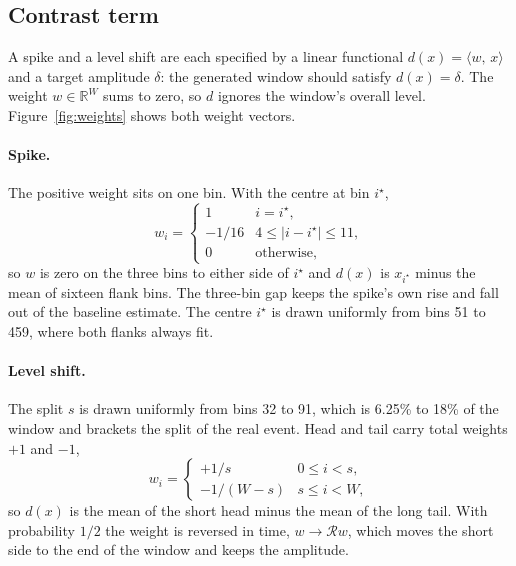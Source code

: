 \documentclass[11pt,a4paper]{article}
\newcommand{\R}{\mathbb{R}}
\newcommand{\istar}{i^{\star}}             %
\newcommand{\rev}{\mathcal{R}}             %
\newcommand{\inner}[2]{\langle #1,\, #2 \rangle}
\begin{document}
\subsection{Contrast term}
\label{sec:contrast}

A spike and a level shift are each specified by a linear functional
$d(x) = \inner{w}{x}$ and a target amplitude $\delta$: the generated window
should satisfy $d(x) = \delta$. The weight $w \in \R^{W}$ sums to zero, so $d$
ignores the window's overall level. Figure~\ref{fig:weights} shows both weight
vectors.

\paragraph{Spike.}
The positive weight sits on one bin. With the centre at bin $\istar$,
\begin{equation}
\label{eq:wspike}
w_{i}
  =
  \begin{cases}
    1 & i = \istar, \\
    -1/16 & 4 \le \lvert i - \istar \rvert \le 11, \\
    0 & \text{otherwise,}
  \end{cases}
\end{equation}
so $w$ is zero on the three bins to either side of $\istar$ and
$d(x)$ is $x_{\istar}$ minus the mean of sixteen flank bins. The three-bin gap
keeps the spike's own rise and fall out of the baseline estimate. The centre
$\istar$ is drawn uniformly from bins 51 to 459, where both flanks always fit.

\paragraph{Level shift.}
The split $s$ is drawn uniformly from bins 32 to 91, which is 6.25\% to 18\%
of the window and brackets the split of the real event. Head and tail carry
total weights $+1$ and $-1$,
\begin{equation}
\label{eq:wstep}
w_{i}
  =
  \begin{cases}
    +1/s & 0 \le i < s, \\
    -1/(W-s) & s \le i < W,
  \end{cases}
\end{equation}
so $d(x)$ is the mean of the short head minus the mean of the long tail. With
probability $1/2$ the weight is reversed in time, $w \to \rev w$, which moves
the short side to the end of the window and keeps the amplitude.
\end{document}
